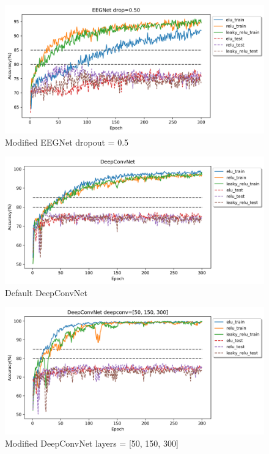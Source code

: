 \documentclass[12pt]{article}
\begin{document}
\begin{figure}[H]
\centering
\includegraphics[width=\linewidth]{Images/EEGNet_drop=050.png}
\caption{Modified EEGNet dropout = 0.5}
\end{figure}

\begin{figure}[H]
\centering
\includegraphics[width=\linewidth]{Images/DeepConvNet.png}
\caption{Default DeepConvNet}
\end{figure}

\begin{figure}[H]
\centering
\includegraphics[width=\linewidth]{Images/DeepConvNet_deepconv=[50,150,300].png}
\caption{Modified DeepConvNet layers = [50, 150, 300]}
\end{figure}
\end{document}
